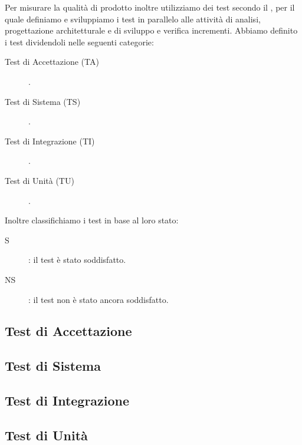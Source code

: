 \documentclass[../piano-di-qualifica.tex]{subfiles}
\begin{document}
Per misurare la qualità di prodotto inoltre utilizziamo dei test secondo il , per il quale definiamo e sviluppiamo i test in parallelo alle attività di analisi, progettazione architetturale e di sviluppo e verifica incrementi.
Abbiamo definito i test dividendoli nelle seguenti categorie:
\begin{description}
  \item [Test di Accettazione (TA)].
  \item [Test di Sistema (TS)].
  \item [Test di Integrazione (TI)].
  \item [Test di Unità (TU)].
\end{description}

Inoltre classifichiamo i test in base al loro stato:
\begin{description}
  \item [S]: il test è stato soddisfatto.
  \item [NS]: il test non è stato ancora soddisfatto.
\end{description}

\subsection{Test di Accettazione}%
\label{subs:test_di_accettazione}


\newpage

\subsection{Test di Sistema}%
\label{subs:test_di_sistema}



\newpage
\subsection{Test di Integrazione}%
\label{subs:test_di_integrazione}



\newpage
\subsection{Test di Unità}%
\label{subs:test_di_unita}


\end{document}
